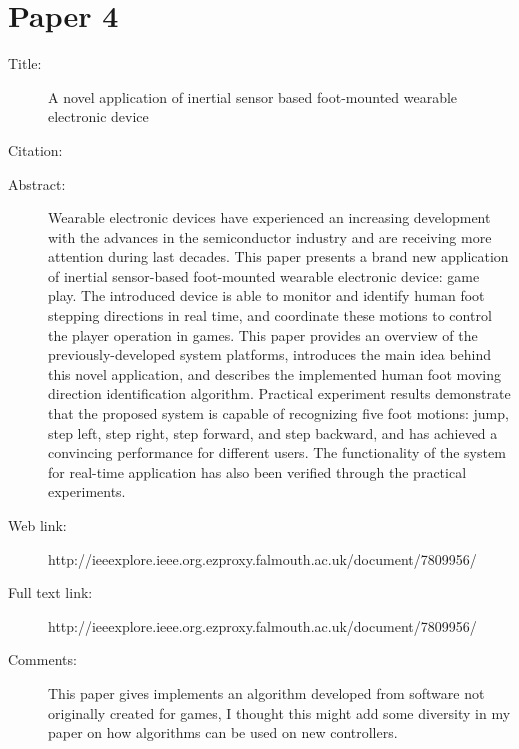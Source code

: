 \documentclass{scrartcl}
\begin{document}
\section*{Paper 4}
\begin{description}
\item[Title:] A novel application of inertial sensor based foot-mounted wearable electronic device
\item[Citation:] \cite{zhou2016novel}
\item[Abstract:] Wearable electronic devices have experienced an increasing development with the advances in the semiconductor industry and are receiving more attention during last decades. This paper presents a brand new application of inertial sensor-based foot-mounted wearable electronic device: game play. The introduced device is able to monitor and identify human foot stepping directions in real time, and coordinate these motions to control the player operation in games. This paper provides an overview of the previously-developed system platforms, introduces the main idea behind this novel application, and describes the implemented human foot moving direction identification algorithm. Practical experiment results demonstrate that the proposed system is capable of recognizing five foot motions: jump, step left, step right, step forward, and step backward, and has achieved a convincing performance for different users. The functionality of the system for real-time application has also been verified through the practical experiments.
\item[Web link:] http://ieeexplore.ieee.org.ezproxy.falmouth.ac.uk/document/7809956/
\item[Full text link:] http://ieeexplore.ieee.org.ezproxy.falmouth.ac.uk/document/7809956/
\item[Comments:] This paper gives implements an algorithm developed from software not originally created for games, I thought this might add some diversity in my paper on how algorithms can be used on new controllers.
\end{description}
\end{document}
